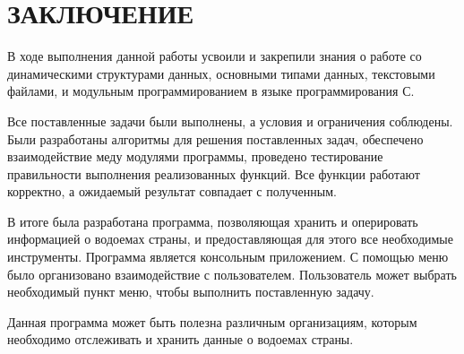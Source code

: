 \newpage

\section*{ЗАКЛЮЧЕНИЕ}

В ходе выполнения данной работы усвоили и закрепили знания о работе со динамическими структурами данных, основными типами данных, текстовыми файлами, и модульным программированием в языке программирования С.

Все поставленные задачи были выполнены, а условия и ограничения соблюдены. Были разработаны алгоритмы для решения поставленных задач, обеспечено взаимодействие меду модулями программы, проведено тестирование правильности выполнения реализованных функций. Все функции работают корректно, а ожидаемый результат совпадает с полученным.
	
В итоге была разработана программа, позволяющая хранить и оперировать информацией о водоемах страны, и предоставляющая для этого все необходимые инструменты. Программа является консольным приложением. С помощью меню было организовано взаимодействие с пользователем. Пользователь может выбрать необходимый пункт меню, чтобы выполнить поставленную задачу.

Данная программа может быть полезна различным организациям, которым необходимо отслеживать и хранить данные о водоемах страны.

\newpage